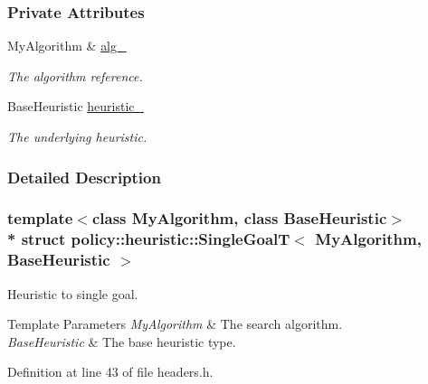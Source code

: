 \subsubsection*{Private Attributes}
\begin{DoxyCompactItemize}
\item 
My\+Algorithm \& \hyperlink{structpolicy_1_1heuristic_1_1SingleGoalT_a0100b6fa637f6d4b203f6ccd22c31ec0}{alg\+\_\+}\hypertarget{structpolicy_1_1heuristic_1_1SingleGoalT_a0100b6fa637f6d4b203f6ccd22c31ec0}{}\label{structpolicy_1_1heuristic_1_1SingleGoalT_a0100b6fa637f6d4b203f6ccd22c31ec0}

\begin{DoxyCompactList}\small\item\em The algorithm reference. \end{DoxyCompactList}\item 
Base\+Heuristic \hyperlink{structpolicy_1_1heuristic_1_1SingleGoalT_a36b9e040ca7d4b4163ee1716e4865468}{heuristic\+\_\+}\hypertarget{structpolicy_1_1heuristic_1_1SingleGoalT_a36b9e040ca7d4b4163ee1716e4865468}{}\label{structpolicy_1_1heuristic_1_1SingleGoalT_a36b9e040ca7d4b4163ee1716e4865468}

\begin{DoxyCompactList}\small\item\em The underlying heuristic. \end{DoxyCompactList}\end{DoxyCompactItemize}


\subsubsection{Detailed Description}
\subsubsection*{template$<$class My\+Algorithm, class Base\+Heuristic$>$\\*
struct policy\+::heuristic\+::\+Single\+Goal\+T$<$ My\+Algorithm, Base\+Heuristic $>$}

Heuristic to single goal. 


\begin{DoxyTemplParams}{Template Parameters}
{\em My\+Algorithm} & The search algorithm. \\
\hline
{\em Base\+Heuristic} & The base heuristic type. \\
\hline
\end{DoxyTemplParams}


Definition at line 43 of file headers.\+h.



